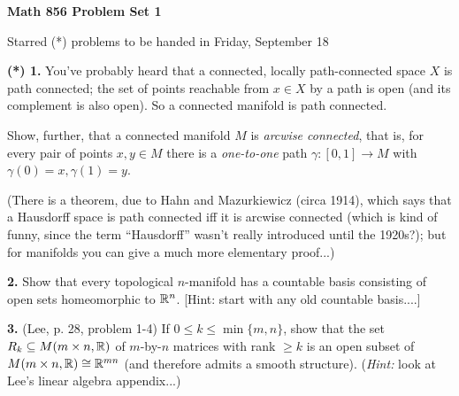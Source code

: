 
\nopagenumbers


\loadmsbm

\def\ctln{\centerline}
\def\ssk{\smallskip}
\def\msk{\medskip}
\def\bsk{\bigskip}
\def\nidt{\noindent}
\def\del{\partial}
\def\bbr{{\Bbb R}}
\def\cla{{\Cal A}}
\def\clb{{\Cal B}}
\def\clc{{\Cal C}}



\ctln{\bf Math 856 Problem Set 1}

\ssk

\ctln{Starred (*) problems to be handed in Friday, September 18}

\bsk

\item{\bf (*) 1.} You've probably heard that a connected, locally path-connected
space $X$ is path connected; the set of points reachable from $x\in X$ by a path is open
(and its complement is also open). So a connected manifold is path connected.

\ssk

\item{} Show, further, that a connected manifold $M$ is {\it arcwise connected},
that is, for every pair of points $x,y\in M$ there is a
{\it one-to-one} path $\gamma:[0,1]\rightarrow M$ with $\gamma(0)=x,\gamma(1)=y$.

\ssk

\item{} (There is a theorem, due to Hahn and Mazurkiewicz (circa 1914), which says 
that a Hausdorff space is path connected iff it is
arcwise connected (which is kind of funny, since the term ``Hausdorff''
wasn't really introduced until the 1920s?); but for manifolds you can 
give a much more elementary proof...)

\msk

\item{\bf 2.} Show that every topological $n$-manifold has a countable basis consisting of
open sets homeomorphic to $\bbr^n$. [Hint: start with any old countable basis....]

\msk

\item{\bf 3.} (Lee, p. 28, problem 1-4) If $0\leq k\leq \min\{m,n\}$, show that the set 
$R_k\subseteq M(m\times n,{\Bbb R})$ of $m$-by-$n$ matrices 
with rank $\geq k$ is an open subset of $M(m\times n,{\Bbb R})
\cong {\Bbb R}^{mn}$ (and therefore admits a smooth structure).
({\it Hint:} look at Lee's linear algebra appendix...)

